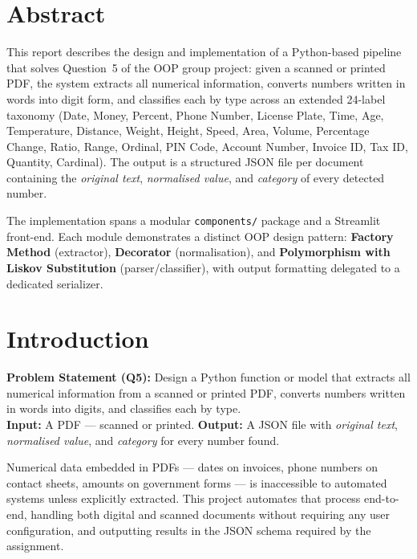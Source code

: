 \documentclass[12pt, a4paper]{article}
\begin{document}
\section*{Abstract}
 
This report describes the design and implementation of a Python-based pipeline
that solves Question~5 of the OOP group project: given a scanned or printed
PDF, the system extracts all numerical information, converts numbers written in
words into digit form, and classifies each by type across an extended
24-label taxonomy (Date, Money, Percent, Phone Number, License Plate, Time,
Age, Temperature, Distance, Weight, Height, Speed, Area, Volume,
Percentage Change, Ratio, Range, Ordinal, PIN Code, Account Number,
Invoice ID, Tax ID, Quantity, Cardinal). The output is a structured JSON file per document
containing the \emph{original text}, \emph{normalised value}, and
\emph{category} of every detected number.
 
The implementation spans a modular \texttt{components/} package and a
Streamlit front-end. Each module demonstrates a distinct OOP design pattern:
\textbf{Factory Method} (extractor), \textbf{Decorator} (normalisation), and
\textbf{Polymorphism with Liskov Substitution} (parser/classifier), with
output formatting delegated to a dedicated serializer.
 
\section{Introduction}
 
\begin{mdframed}[style=infobox]
\textbf{Problem Statement (Q5):} Design a Python function or model that
extracts all numerical information from a scanned or printed PDF, converts
numbers written in words into digits, and classifies each by type.\\[4pt]
\textbf{Input:} A PDF --- scanned or printed.\quad
\textbf{Output:} A JSON file with \emph{original text}, \emph{normalised
value}, and \emph{category} for every number found.
\end{mdframed}
 
Numerical data embedded in PDFs --- dates on invoices, phone numbers on
contact sheets, amounts on government forms --- is inaccessible to automated
systems unless explicitly extracted. This project automates that process
end-to-end, handling both digital and scanned documents without requiring
any user configuration, and outputting results in the JSON schema required
by the assignment.
\end{document}
